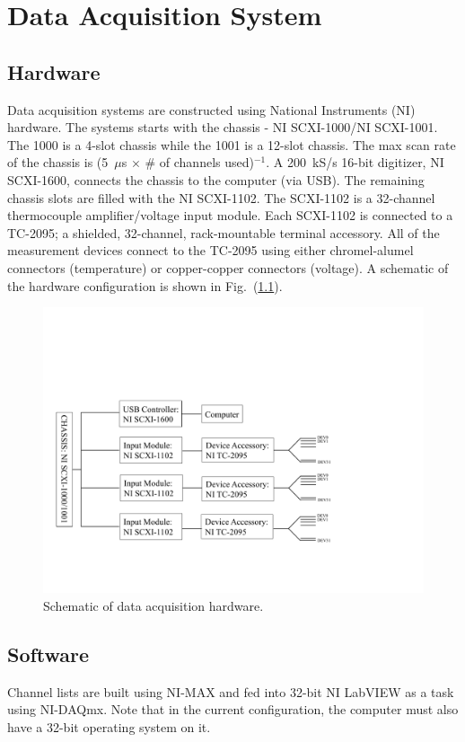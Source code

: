 \documentclass[11pt,oneside]{book}
\begin{document}
\mainmatter


\chapter{Data Acquisition System}
\label{chap:DAQ}

\section{Hardware}
Data acquisition systems are constructed using National Instruments (NI) hardware. The systems starts with the chassis - NI SCXI-1000/NI SCXI-1001. The 1000 is a 4-slot chassis while the 1001 is a 12-slot chassis. The max scan rate of the chassis is (5~$\mu$s $\times$ \# of channels used)$^{-1}$. A 200~kS/s 16-bit digitizer, NI SCXI-1600, connects the chassis to the computer (via USB). The remaining chassis slots are filled with the NI SCXI-1102. The SCXI-1102 is a 32-channel thermocouple amplifier/voltage input module. Each SCXI-1102 is connected to a TC-2095; a shielded, 32-channel, rack-mountable terminal accessory. All of the measurement devices connect to the TC-2095 using either chromel-alumel connectors (temperature) or copper-copper connectors (voltage). A schematic of the hardware configuration is shown in Fig.~(\ref{fig:daq_schem}).

\begin{figure}[h!]
\includegraphics[width=5in]{Figures/DAQ_Schematic}
\caption{Schematic of data acquisition hardware.}
\label{fig:daq_schem}
\end{figure}

\section{Software}
Channel lists are built using NI-MAX and fed into 32-bit NI LabVIEW as a task using NI-DAQmx. Note that in the current configuration, the computer must also have a 32-bit operating system on it.
\end{document}
